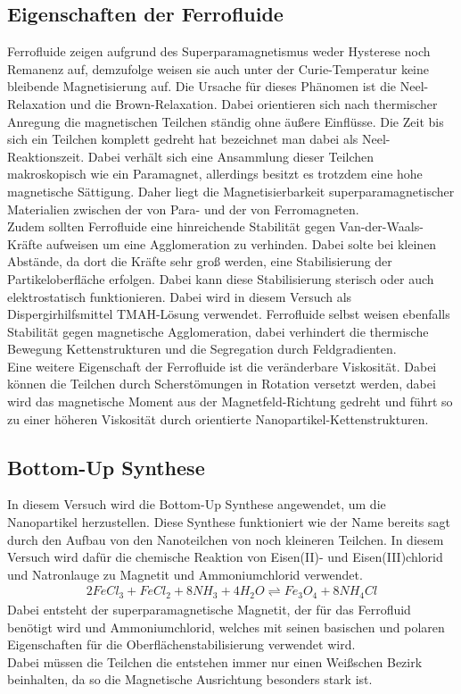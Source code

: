\documentclass[a4paper]{TUBAFprotokoll}
\begin{document}
		\subsection{Eigenschaften der Ferrofluide}
		Ferrofluide zeigen aufgrund des Superparamagnetismus weder Hysterese noch Remanenz auf, demzufolge weisen sie auch unter der Curie-Temperatur keine bleibende Magnetisierung auf. Die Ursache für dieses Phänomen ist die Neel-Relaxation und die Brown-Relaxation. Dabei orientieren sich nach thermischer Anregung die magnetischen Teilchen ständig ohne äußere Einflüsse. Die Zeit bis sich ein Teilchen komplett gedreht hat bezeichnet man dabei als Neel-Reaktionszeit. Dabei verhält sich eine Ansammlung dieser Teilchen makroskopisch wie ein Paramagnet, allerdings besitzt es trotzdem eine hohe magnetische Sättigung. Daher liegt die Magnetisierbarkeit superparamagnetischer Materialien zwischen der von Para- und der von Ferromagneten.\\
		Zudem sollten Ferrofluide eine hinreichende Stabilität gegen Van-der-Waals-Kräfte aufweisen um eine Agglomeration zu verhinden. Dabei solte bei kleinen Abstände, da dort die Kräfte sehr groß werden, eine Stabilisierung der Partikeloberfläche erfolgen. Dabei kann diese Stabilisierung sterisch oder auch elektrostatisch funktionieren. Dabei wird in diesem Versuch als Dispergirhilfsmittel TMAH-Lösung verwendet. Ferrofluide selbst weisen ebenfalls Stabilität gegen magnetische Agglomeration, dabei verhindert die thermische Bewegung Kettenstrukturen und die Segregation durch Feldgradienten. \\
		Eine weitere Eigenschaft der Ferrofluide ist die veränderbare Viskosität. Dabei können die Teilchen durch Scherstömungen in Rotation versetzt werden, dabei wird das magnetische Moment aus der Magnetfeld-Richtung gedreht und führt so zu einer höheren Viskosität durch orientierte Nanopartikel-Kettenstrukturen.
		
		\subsection{Bottom-Up Synthese}
		In diesem Versuch wird die Bottom-Up Synthese angewendet, um die Nanopartikel herzustellen. Diese Synthese funktioniert wie der Name bereits sagt durch den Aufbau von den Nanoteilchen von noch kleineren Teilchen. In diesem Versuch wird dafür die chemische Reaktion von Eisen(II)- und Eisen(III)chlorid und Natronlauge zu Magnetit und Ammoniumchlorid verwendet. \\
		\begin{align*}
			2FeCl_{3} + FeCl_{2} + 8 NH_{3} + 4 H_{2}O \rightleftharpoons Fe_{3}O_{4} + 8 NH_{4}Cl
		\end{align*}
		Dabei entsteht der superparamagnetische Magnetit, der für das Ferrofluid benötigt wird und Ammoniumchlorid, welches mit seinen basischen und polaren Eigenschaften für die Oberflächenstabilisierung verwendet wird.\\ Dabei müssen die Teilchen die entstehen immer nur einen Weißschen Bezirk beinhalten, da so die Magnetische Ausrichtung besonders stark ist.
		
\end{document}
